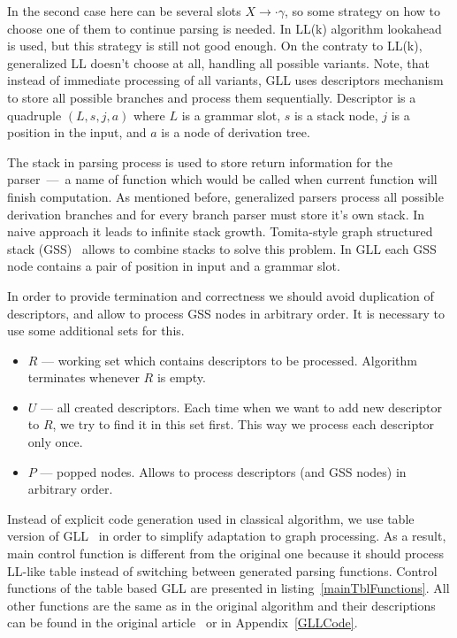 In the second case here can be several slots $X \rightarrow \cdot \gamma$, so some strategy on how to choose one of them to continue parsing is needed.
In LL(k) algorithm lookahead is used, but this strategy is still not good enough.
On the contraty to LL(k), generalized LL doesn't choose at all, handling all possible variants.
Note, that instead of immediate processing of all variants, GLL uses descriptors mechanism to store all possible branches and process them sequentially. 
Descriptor is a quadruple $(L, s, j, a)$ where $L$ is a grammar slot, $s$ is a stack node, $j$ is a position in the input, and $a$ is a node of derivation tree. 

The stack in parsing process is used to store return information for the parser~---~a name of function which would be called when current function will finish computation. 
As mentioned before, generalized parsers process all possible derivation branches and for every branch parser must store it's own stack. 
In naive approach it leads to infinite stack growth.  
Tomita-style graph structured stack (GSS)~\cite{Tomita} allows to combine stacks to solve this problem.
In GLL each GSS node contains a pair of position in input and a grammar slot. 

In order to provide termination and correctness we should avoid duplication of descriptors, and allow to process GSS nodes in arbitrary order. It is necessary to use some additional sets for this.
\begin{itemize}
\item $R$ --- working set which contains descriptors to be processed. Algorithm terminates whenever $R$ is empty.
\item $U$ --- all created descriptors. Each time when we want to add new descriptor to $R$, we try to find it in this set first.  This way we process each descriptor only once.
\item $P$ --- popped nodes. Allows to process descriptors (and GSS nodes) in arbitrary order. 
\end{itemize}

Instead of explicit code generation used in classical algorithm, we use table version of GLL~\cite{TableGLL} in order to simplify adaptation to graph processing.
As a result, main control function is different from the original one because it should process LL-like table instead of switching between generated parsing functions.
Control functions of the table based GLL are presented in listing~\ref{mainTblFunctions}.
All other functions are the same as in the original algorithm and their descriptions can be found in the original article~\cite{scott2010gll} or in Appendix~\ref{GLLCode}.


